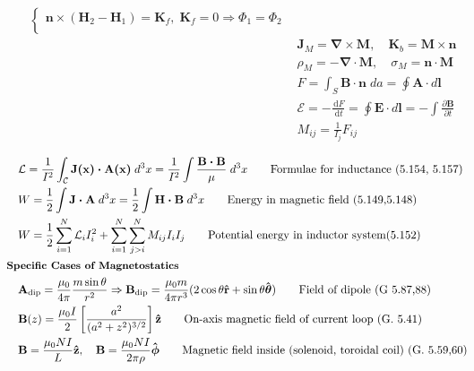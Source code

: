 \documentclass[10pt]{article}
\newcommand{\rhat}{\boldsymbol{\hat{\textbf{r}}}}
\newcommand{\zhat}{\boldsymbol{\hat{\textbf{z}}}}
\newcommand{\phihat}{\boldsymbol{\hat{\textbf{$\phi$}}}}
\newcommand{\thetahat}{\boldsymbol{\hat{\textbf{$\theta$}}}}
\newcommand{\ve}[1]{\boldsymbol{\mathbf{#1}}}
\newcommand{\vect}[1]{\boldsymbol{\mathbf{#1}}}
\newcommand{\dd}{\, \mathrm{d}}
\newcommand{\tder}[2]{\frac{\dd #1}{\dd #2}}
\newcommand{\pder}[2]{\frac{\partial #1}{\partial #2}}
\newcommand{\lrb}[1]{\left[ #1 \right]}
\begin{document}
\begin{multicols}{2}
\begin{align*}
\begin{cases}
			\vect{n} \times (\vect{H}_2 - \vect{H}_1) = \vect{K}_f, \; \ve{K}_f = 0 \Rightarrow \Phi_1 = \Phi_2 \\
		\end{cases} \tag*{Magnetic JC's (eval. at boundary) (5.86)} \\
		& \vect{J}_M = \vect{\nabla \times M}, \quad \vect{K}_b = \vect{M \times n}  \tag*{Bound current density (G. 6.13,14)} \\
		& \rho_M = - \vect{\nabla \cdot M}, \quad \sigma_M = \vect{n \cdot M} \tag*{Effective magnetic charge density (5.96,99)} \\
		& F = \int_S \vect{B \cdot n} \; da = \oint \ve{A} \cdot d \ve{l} \tag*{Magnetic flux (5.133)} \\
		& \mathscr{E} = -\tder{F}{t} = \oint \ve{E} \cdot d\ve{l} = -\int \pder{\ve{B}}{t} \tag*{EMF due to Faraday's Law (5.135)} \\
		& M_{ij} = \frac{1}{I_j} F_{ij} \tag*{Mutual inductance (5.156)} \\
	\end{align*}
	\setlength{\abovedisplayskip}{-25pt}
	\setlength{\belowdisplayskip}{0pt}
	\setlength{\abovedisplayshortskip}{0pt}
	\setlength{\belowdisplayshortskip}{0pt}
	\begin{align*} 
		& \mathcal{L} = \frac{1}{I^2} \int_\mathcal{C} \ve{J(x) \cdot A(x)} \; d^3 x = \frac{1}{I^2} \int \frac{\ve{B \cdot B}}{\mu} \; d^3 x \tag*{Formulae for inductance (5.154, 5.157)} \\
		& W = \frac{1}{2} \int \vect{J \cdot A} \; d^3 x  = \frac{1}{2} \int \vect{H \cdot B} \; d^3 x \tag*{Energy in magnetic field (5.149,5.148)} \\
		& W = \frac{1}{2} \sum_{i=1}^N \mathcal{L}_i I_i^2 + \sum_{i=1}^N \sum_{j>i}^N M_{ij} I_i I_j \tag*{Potential energy in inductor system(5.152)} \\
	& \small \hspace{-10pt} \textbf{Specific Cases of Magnetostatics} \small \\
		&\ve{A}_{\text{dip}} = \frac{\mu_0}{4 \pi} \frac{m \sin \theta}{r^2} \Rightarrow \ve{B}_{\text{dip}} = \frac{\mu_0 m}{4 \pi r^3}(2 \cos \theta \rhat + \sin \theta \thetahat) \tag*{Field of dipole (G 5.87,88)} \\
		& \ve{B}(z) = \frac{\mu_0 I}{2} \lrb{ \frac{a^2}{(a^2 + z^2)^{3/2}} }\zhat \tag*{On-axis magnetic field of current loop (G. 5.41)} \\
		& \ve{B} = \frac{\mu_0 N I}{L} \zhat, \quad \ve{B} = \frac{\mu_0 N I}{2 \pi \rho} \phihat \tag*{Magnetic field inside (solenoid, toroidal coil) (G. 5.59,60)} \\

\end{align*}
\end{multicols}
\end{document}
